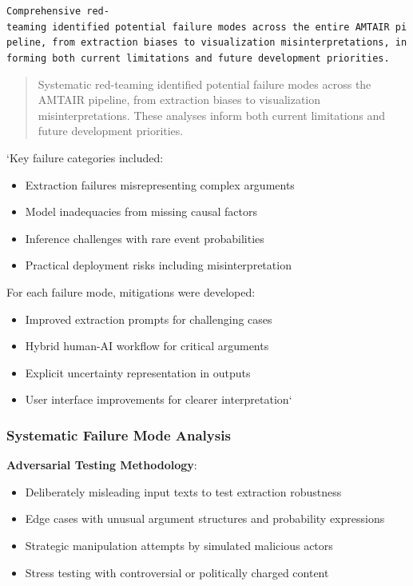 \documentclass[
  11pt,
  letterpaper,
]{book}
\providecommand{\tightlist}{%
  \setlength{\itemsep}{0pt}\setlength{\parskip}{0pt}}
\begin{document}
\texttt{Comprehensive\ red-teaming\ identified\ potential\ failure\ modes\ across\ the\ entire\ AMTAIR\ pipeline,\ from\ extraction\ biases\ to\ visualization\ misinterpretations,\ informing\ both\ current\ limitations\ and\ future\ development\ priorities.}

\begin{quote}
Systematic red-teaming identified potential failure modes across the
AMTAIR pipeline, from extraction biases to visualization
misinterpretations. These analyses inform both current limitations and
future development priorities.
\end{quote}

`Key failure categories included:

\begin{itemize}
\tightlist
\item
  Extraction failures misrepresenting complex arguments
\item
  Model inadequacies from missing causal factors
\item
  Inference challenges with rare event probabilities
\item
  Practical deployment risks including misinterpretation
\end{itemize}

For each failure mode, mitigations were developed:

\begin{itemize}
\tightlist
\item
  Improved extraction prompts for challenging cases
\item
  Hybrid human-AI workflow for critical arguments
\item
  Explicit uncertainty representation in outputs
\item
  User interface improvements for clearer interpretation`
\end{itemize}

\subsubsection{Systematic Failure Mode
Analysis}\label{sec-failure-mode-analysis}

\textbf{Adversarial Testing Methodology}:

\begin{itemize}
\tightlist
\item
  Deliberately misleading input texts to test extraction robustness
\item
  Edge cases with unusual argument structures and probability
  expressions
\item
  Strategic manipulation attempts by simulated malicious actors
\item
  Stress testing with controversial or politically charged content
\end{itemize}
\end{document}
